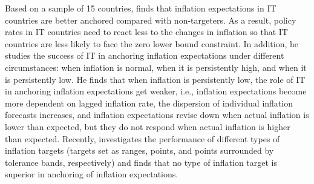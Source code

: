 \documentclass{article}
\begin{document}
Based on a sample of 15 countries, \citet{ehrmann2015} finds that inflation expectations in IT countries are better anchored compared with non-targeters. As a result, policy rates in IT countries need to react less to the changes in inflation so that IT countries are less likely to face the zero lower bound constraint. In addition, he studies the success of IT in anchoring inflation expectations under different circumstances: when inflation is normal, when it is persistently high, and when it is persistently low. He finds that when inflation is persistently low, the role of IT in anchoring inflation expectations get weaker, i.e., inflation expectations become more dependent on lagged inflation rate, the dispersion of individual inflation forecasts increases, and inflation expectations revise down when actual inflation is lower than expected, but they do not respond when actual inflation is higher than expected. Recently, \citet{ehrmann2021} investigates the performance of different types of inflation targets (targets set as ranges, points, and points surrounded by tolerance bands, respectively) and finds that no type of inflation target is superior in anchoring of inflation expectations.
\end{document}
